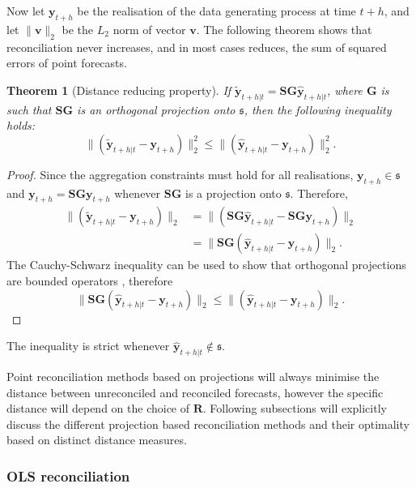 \documentclass[12pt]{article}
\newtheorem{theo}{Theorem}[section]
\theoremstyle{definition}
\begin{document}
	
		
	Now let $\bm{y}_{t+h}$ be the realisation of the data generating process at time $t+h$, and let $\|\bm{v}\|_2$ be the $L_2$ norm of vector $\bm{v}$. The following theorem shows that reconciliation never increases, and in most cases reduces, the sum of squared errors of point forecasts.
	
	
	
	\begin{theo}[Distance reducing property]
		If $\tilde{\bm{y}}_{t+h|t}=\bm{S}\bm{G}\hat{\bm{y}}_{t+h|t}$, where $\bm{G}$ is such that $\bm{S}\bm{G}$ is an orthogonal projection onto $\mathfrak{s}$, then the following inequality holds:
		\begin{equation}
		\|(\tilde{\bm{y}}_{t+h|t}-\bm{y}_{t+h})\|^2_2\le\|(\hat{\bm{y}}_{t+h|t}-\bm{y}_{t+h})\|^2_2.
		\end{equation}
	\end{theo}
	\begin{proof}
		Since the aggregation constraints must hold for all realisations, $\bm{y}_{t+h}\in\mathfrak{s}$ and $\bm{y}_{t+h}=\bm{S}\bm{G}\bm{y}_{t+h}$ whenever $\bm{S}\bm{G}$ is a projection onto $\mathfrak{s}$. Therefore,
		\begin{align}
		\|(\tilde{\bm{y}}_{t+h|t}-\bm{y}_{t+h})\|_2&=\|(\bm{S}\bm{G}\hat{\bm{y}}_{t+h|t}-\bm{S}\bm{G}\bm{y}_{t+h})\|_2\\
		&=\|\bm{S}\bm{G}(\hat{\bm{y}}_{t+h|t}-\bm{y}_{t+h})\|_2.
		\end{align}
		The Cauchy-Schwarz inequality can be used to show that orthogonal projections are bounded operators \citep{Hun2001}, therefore
		\begin{equation*}
		\|\bm{S}\bm{G}(\hat{\bm{y}}_{t+h|t}-\bm{y}_{t+h})\|_2\le
		\|(\hat{\bm{y}}_{t+h|t}-\bm{y}_{t+h})\|_2.
		\end{equation*}
	\end{proof}
	The inequality is strict whenever $\hat{\bm{y}}_{t+h|t}\notin\mathfrak{s}$.
	
	Point reconciliation methods based on projections will always minimise the distance between unreconciled and reconciled forecasts, however the specific distance will depend on the choice of $\bm{R}$. Following subsections will explicitly discuss the different projection based reconciliation methods and their optimality based on distinct distance measures. 
	
	\subsubsection{OLS reconciliation}
	
\end{document}
